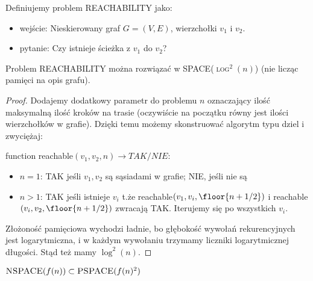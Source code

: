 \begin{definition}
    Definiujemy problem \textsc{REACHABILITY} jako:
    \begin{itemize}
        \item wejście: Nieskierowany graf \( G = (V, E) \), wierzchołki \(v_1\) i \(v_2\).
        \item pytanie: Czy istnieje ścieżka z \(v_1\) do \(v_2\)? 
    \end{itemize}
\end{definition}

\begin{lemma}
    Problem \textsc{REACHABILITY} można rozwiązać w \textsc{SPACE(\(\log^2(n)\))} (nie licząc pamięci na opis grafu).
\end{lemma}

\begin{proof}
    
    Dodajemy dodatkowy parametr do problemu \(n\) oznaczający ilość maksymalną ilość kroków na trasie (oczywiście na początku równy jest ilości wierzchołków w grafie). Dzięki temu możemy skonstruować algorytm typu dziel i zwyciężaj:

    function reachable\((v_1, v_2, n) \rightarrow TAK/NIE\):

    \begin{itemize}
        \item \( n = 1 \): TAK jeśli \(v_1, v_2\) są sąsiadami w grafie; NIE, jeśli nie są
        \item \( n > 1 \): TAK jeśli istnieje \(v_i\) t.że reachable\((v_1, v_i, \floor{{n+1}/2})\) i reachable\((v_i, v_2, \floor{{n+1}/2}) \) zwracają TAK. Iterujemy się po wszystkich \(v_i\).
    \end{itemize}
    
    Złożoność pamięciowa wychodzi ładnie, bo głębokość wywołań rekurencyjnych jest logarytmiczna, i w każdym wywołaniu trzymamy liczniki logarytmicznej długości. Stąd też mamy \(\log^2(n)\). 

\end{proof}
    
\begin{theorem}[Savitch]
    \( \textsc{NSPACE}(f(n)) \subset \textsc{PSPACE}(f(n)^2)\) 
\end{theorem}

